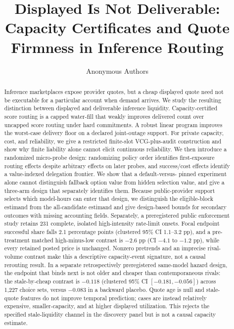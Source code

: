 \documentclass[11pt]{article}
\title{Displayed Is Not Deliverable: Capacity Certificates and Quote Firmness
in Inference Routing}
\author{Anonymous Authors}
\date{}
\theoremstyle{definition}
\begin{document}
\maketitle

\begin{abstract}
Inference marketplaces expose provider quotes, but a cheap displayed quote need
not be executable for a particular account when demand arrives. We study the
resulting distinction between displayed and deliverable inference liquidity.
Capacity-certified score routing is a capped water-fill that weakly improves
delivered count over uncapped score routing under hard commitments. A robust
linear program improves the worst-case delivery floor on a declared joint-outage
support. For private capacity, cost, and reliability, we give a restricted
finite-slot VCG-plus-audit construction and show why finite liability alone
cannot elicit continuous reliability. We then introduce a randomized
micro-probe design: randomizing policy order identifies first-exposure routing
effects despite arbitrary effects on later probes, and success/cost effects
identify a value-indexed delegation frontier. We show that a default-versus-
pinned experiment alone cannot distinguish fallback option value from hidden
selection value, and give a three-arm design that separately identifies them.
Because public-provider support selects which model-hours can enter that design,
we distinguish the eligible-block estimand from the all-candidate estimand and
give design-based bounds for secondary outcomes with missing accounting fields.
Separately, a preregistered public enforcement study retains 231 complete,
isolated high-intensity rate-limit onsets. Focal endpoint successful share falls
2.1 percentage points (clustered 95\% CI 1.1--3.2 pp), and a pre-treatment
matched high-minus-low contrast is $-2.6$ pp (CI $-4.1$ to $-1.2$ pp), while
every retained posted price is unchanged. Nonzero pretrends and an imprecise
rival-volume contrast make this a descriptive capacity-event signature, not a
causal rerouting result.
In a separate retrospectively preregistered same-model hazard design, the
endpoint that binds next is not older and cheaper than contemporaneous rivals:
the stale-by-cheap contrast is $-0.118$ (clustered 95\% CI
$[-0.181,-0.056]$) across 1,227 choice sets, versus $-0.083$ in a backward
placebo. Quote age is null and stale-quote features do not improve temporal
prediction; cases are instead relatively expensive, smaller-capacity, and at
higher displayed utilization. This rejects the specified stale-liquidity
channel in the discovery panel but is not a causal capacity estimate.

\end{abstract}
\end{document}

